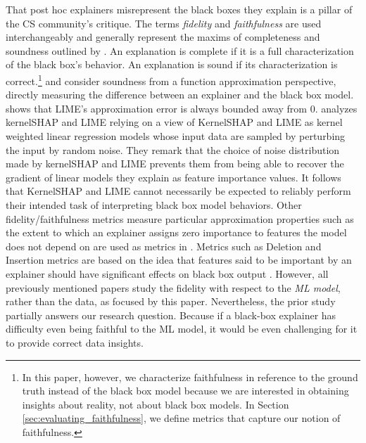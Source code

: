 \documentclass[mnsc,blindrev]{informs3}
\begin{document}
    
        That post hoc explainers misrepresent the black boxes they explain is a pillar of the CS community's critique. The terms \emph{fidelity} and \emph{faithfulness} are used interchangeably and generally represent the maxims of completeness and soundness outlined by \cite{zhou21evaluating}. An explanation is complete if it is a full characterization of the black box's behavior. An explanation is sound if its characterization is correct.\footnote{In this paper, however, we characterize faithfulness in reference to the ground truth instead of the black box model because we are interested in obtaining insights about reality, not about black box models. In Section \ref{sec:evaluating_faithfulness}, we define metrics that capture our notion of faithfulness.} 
    \cite{garreau2020looking} and \cite{han22which} consider soundness from a function approximation perspective, directly measuring the difference between an explainer  and the black box model. \cite{garreau2020looking} shows that LIME's approximation error is always bounded away from 0. \cite{han22which} analyzes kernelSHAP and LIME relying on a view of KernelSHAP and LIME as kernel weighted linear regression models whose input data are sampled by perturbing the input by random noise. They remark that the choice of noise distribution made by kernelSHAP and LIME prevents them from being able to recover the gradient of linear models they explain as feature importance values. It follows that KernelSHAP and LIME cannot necessarily be expected to reliably perform their intended task of interpreting black box model behaviors. 
Other fidelity/faithfulness metrics measure particular approximation properties such as the extent to which an explainer assigns zero importance to features the model does not depend on are used as metrics in \cite{nguyen2020quantitative}. Metrics such as Deletion and Insertion metrics are based on the idea that features said to be important by an explainer should have significant effects on black box output \citep{deyoung20deeraser,nguyen2020quantitative,alvarez18robustness,luss2021leveraging}. However, all previously mentioned papers study the fidelity with respect to the \textit{ML model}, rather than the data, as focused by this paper. Nevertheless, the prior study partially answers our research question. Because if a black-box explainer has difficulty even being faithful to the ML model, it would be even challenging for it to provide correct data insights.
    
\end{document}

